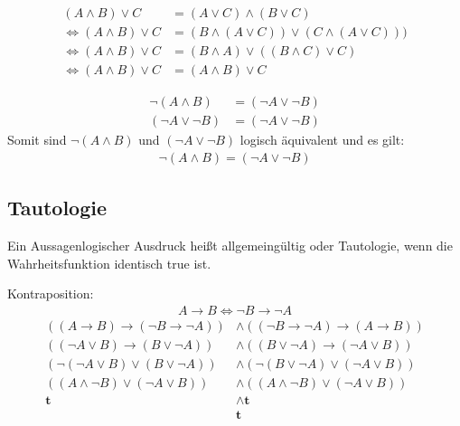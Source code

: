 \documentclass[../ana2u.tex]{subfiles}
\begin{document}
\begin{bsp}
    \begin{align*}
        (A \wedge B) \vee C &= (A \vee C) \wedge (B \vee C)\\
        \Leftrightarrow (A \wedge B) \vee C &= (B \wedge (A \vee C)) \vee (C \wedge (A \vee C)))\\
        \Leftrightarrow (A \wedge B) \vee C &=  (B \wedge A) \vee ((B \wedge C) \vee C)\\
        \Leftrightarrow (A \wedge B) \vee C &= (A \wedge B) \vee C
    \end{align*}		
\end{bsp}
\begin{bsp}
    \begin{align*}
        \neg(A \wedge B) &= (\neg A \vee \neg B)\\
        (\neg A \vee \neg B) &= (\neg A \vee \neg B)
    \end{align*}
    Somit sind \(\neg(A \wedge B)\) und \((\neg A \vee \neg B)\) logisch äquivalent und es gilt:
    \begin{align*}
        \neg(A \wedge B) = (\neg A \vee \neg B)
    \end{align*}
\end{bsp}
\subsection{Tautologie}
\begin{defi}
    Ein Aussagenlogischer Ausdruck heißt allgemeingültig oder Tautologie, wenn die Wahrheitsfunktion identisch true ist.
\end{defi}	
\begin{bsp}
    Kontraposition:
    \begin{align*}
        A \rightarrow B \Leftrightarrow \neg B \rightarrow \neg A
    \end{align*}
    \begin{align*}
        ((A \rightarrow B) \rightarrow (\neg B \rightarrow \neg A)) &\wedge ((\neg B \rightarrow \neg A) \rightarrow (A \rightarrow B))\\
        ((\neg A \vee B) \rightarrow (B \vee \neg A)) &\wedge ((B \vee \neg A) \rightarrow (\neg A \vee B))\\
        (\neg (\neg A \vee B) \vee (B \vee \neg A)) &\wedge (\neg (B \vee \neg A) \vee (\neg A \vee B))\\
        ((A \wedge \neg B) \vee (\neg A \vee B)) &\wedge ((A \wedge \neg B) \vee (\neg A \vee B))\\
        \textbf{t} &\wedge \textbf{t} \\
        &\textbf{t}        
    \end{align*}
\end{bsp}
\end{document}
